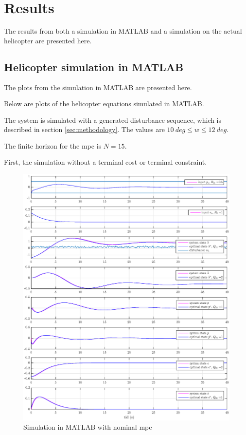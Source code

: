 \chapter{Results}\label{ch:results}

The results from both a simulation in MATLAB and a simulation on the actual helicopter are presented here.


\section{Helicopter simulation in MATLAB}

The plots from the simulation in MATLAB are presented here. 


Below are plots of the helicopter equations simulated in MATLAB.

The system is simulated with a generated disturbance sequence, which is described in section \ref{sec:methodology}. The values are $10 \: deg \leq w \leq 12\:  deg.$


The finite horizon for the \acrshort{mpc} is $N = 15$.

First, the simulation without a terminal cost or terminal constraint.

\begin{figure}[h!]
    \centering
    \includegraphics[scale=0.4]{fig/heli_sim_no_est_not_stable_extended_horizon.eps}
    \caption{Simulation in MATLAB with nominal \acrshort{mpc}}
    \label{fig:my_label}
\end{figure}

